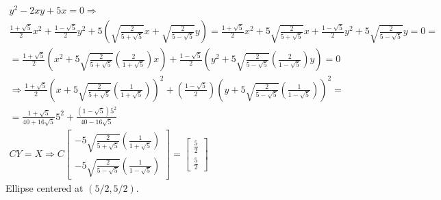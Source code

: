 \documentclass[twoside]{amsart}
\theoremstyle{plain}
\theoremstyle{definition}
\begin{document}
\[
\begin{gathered}
  y^2 - 2xy + 5x = 0 \Longrightarrow \\ 
  \frac{ 1 + \sqrt{5}}{2} x^2 + \frac{ 1 - \sqrt{5}}{2} y^2 + 5 \left( \sqrt{ \frac{2}{ 5 + \sqrt{5}} } x + \sqrt{ \frac{2}{ 5 - \sqrt{5}} } y \right) = \frac{1 + \sqrt{5}}{2} x^2+ 5 \sqrt{ \frac{2}{ 5 + \sqrt{5}}} x + \frac{1 - \sqrt{5}}{2} y^2 + 5 \sqrt{ \frac{2}{ 5 - \sqrt{5}} } y = 0 = \\
    = \frac{ 1 + \sqrt{5}}{2} \left( x^2 + 5 \sqrt{ \frac{2}{ 5 + \sqrt{5}}} \left( \frac{2}{ 1 + \sqrt{5}} \right) x \right) + \frac{ 1- \sqrt{5}}{2} \left( y^2 + 5 \sqrt{ \frac{2}{ 5- \sqrt{5}}} \left( \frac{2}{ 1 - \sqrt{5} } \right) y \right) = 0 \\ 
    \Longrightarrow \frac{ 1 + \sqrt{5}}{2} \left( x + 5 \sqrt{ \frac{ 2 }{5 + \sqrt{5}}} \left( \frac{1}{ 1 + \sqrt{5}} \right) \right)^2 + \left( \frac{ 1 - \sqrt{5}}{2} \right)\left( y + 5 \sqrt{ \frac{2}{5- \sqrt{5}} } \left( \frac{1}{ 1 - \sqrt{5}} \right) \right)^2 = \\
    = \frac{ 1 + \sqrt{5}}{40 + 16 \sqrt{5}} 5^2 + \frac{ (1- \sqrt{5}) 5^2 }{ 40 - 16 \sqrt{5}} \\
    CY = X \Longrightarrow C \left[ \begin{matrix} -5 \sqrt{ \frac{ 2}{ 5 + \sqrt{5}}} \left( \frac{1}{ 1 + \sqrt{5}} \right) \\ -5 \sqrt{ \frac{ 2}{ 5- \sqrt{5}} } \left( \frac{1 }{ 1 - \sqrt{5}} \right) \end{matrix} \right] = \left[ \begin{matrix} \frac{5}{2} \\ \frac{5}{2} \end{matrix} \right]
\end{gathered}
\]
Ellipse centered at $(5/2,5/2)$.  
\end{document}
